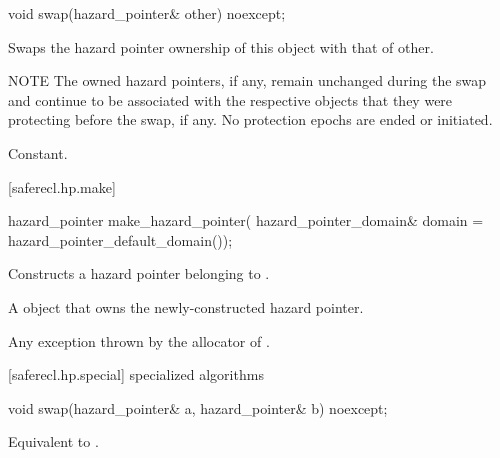 \begin{itemdecl}
void swap(hazard_pointer& other) noexcept;
\end{itemdecl}

\begin{itemdescr}

\effects 
Swaps the hazard pointer ownership of this object with that of other.

NOTE The owned hazard pointers, if any, remain unchanged during the swap and continue to be associated with the respective objects that they were protecting before the swap, if any. No protection epochs are ended or initiated.

\complexity 
Constant.

\end{itemdescr}

[saferecl.hp.make]{}

\begin{itemdecl}
hazard_pointer make_hazard_pointer(
  hazard_pointer_domain& domain = hazard_pointer_default_domain());
\end{itemdecl}

\begin{itemdescr}

\effects 
Constructs a hazard pointer belonging to .

\returns 
A  object that owns the newly-constructed hazard pointer.

\throws 
Any exception thrown by the allocator of .

\end{itemdescr}

[saferecl.hp.special]{ specialized algorithms}

\begin{itemdecl}
void swap(hazard_pointer& a, hazard_pointer& b) noexcept;
\end{itemdecl}

\begin{itemdescr}

\effects 
Equivalent to .

\end{itemdescr}
